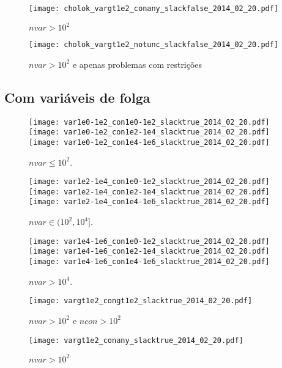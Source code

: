 \documentclass{article}
\begin{document}
\begin{figure}[H]
\centering
\texttt{[image: cholok\_vargt1e2\_conany\_slackfalse\_2014\_02\_20.pdf]}
\caption{ $nvar > 10^2$ }
\label{fig:nvar_medium_and_big}
\end{figure}

\begin{figure}[H]
\centering
\texttt{[image: cholok\_vargt1e2\_notunc\_slackfalse\_2014\_02\_20.pdf]}
\caption{ $nvar > 10^2$ e apenas problemas com restrições }
\label{fig:nvar_medium_and_big_not_unc}
\end{figure}

\newpage
\subsection{Com variáveis de folga}

\begin{figure}[H]
\centering
\texttt{[image: var1e0-1e2\_con1e0-1e2\_slacktrue\_2014\_02\_20.pdf]}
\texttt{[image: var1e0-1e2\_con1e2-1e4\_slacktrue\_2014\_02\_20.pdf]}
\texttt{[image: var1e0-1e2\_con1e4-1e6\_slacktrue\_2014\_02\_20.pdf]}
\caption{ $nvar \leq 10^2$. }
\label{fig:nvar_small}
\end{figure}
\begin{figure}[H]
\centering
\texttt{[image: var1e2-1e4\_con1e0-1e2\_slacktrue\_2014\_02\_20.pdf]}
\texttt{[image: var1e2-1e4\_con1e2-1e4\_slacktrue\_2014\_02\_20.pdf]}
\texttt{[image: var1e2-1e4\_con1e4-1e6\_slacktrue\_2014\_02\_20.pdf]}
\caption{ $nvar \in (10^2,10^4]$. }
\label{fig:nvar_medium}
\end{figure}
\begin{figure}[H]
\centering
\texttt{[image: var1e4-1e6\_con1e0-1e2\_slacktrue\_2014\_02\_20.pdf]}
\texttt{[image: var1e4-1e6\_con1e2-1e4\_slacktrue\_2014\_02\_20.pdf]}
\texttt{[image: var1e4-1e6\_con1e4-1e6\_slacktrue\_2014\_02\_20.pdf]}
\caption{ $nvar > 10^4$. }
\label{fig:nvar_big}
\end{figure}

\begin{figure}[H]
\centering
\texttt{[image: vargt1e2\_congt1e2\_slacktrue\_2014\_02\_20.pdf]}
\caption{ $nvar > 10^2$ e $ncon > 10^2$ }
\label{fig:both_medium_and_big}
\end{figure}

\begin{figure}[H]
\centering
\texttt{[image: vargt1e2\_conany\_slacktrue\_2014\_02\_20.pdf]}
\caption{ $nvar > 10^2$ }
\label{fig:nvar_medium_and_big}
\end{figure}
\end{document}
